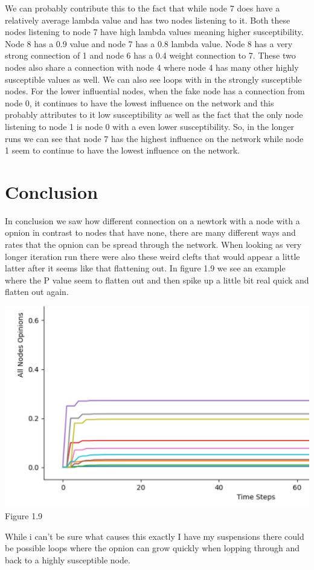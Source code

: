\documentclass[letterpaper]{article}
\begin{document}
We can probably contribute this to the fact that while node 7 does have a relatively average lambda value and has two nodes listening to it. Both these nodes listening to node 7 have  high lambda values meaning higher susceptibility.  Node 8 has a 0.9 value and node 7 has a 0.8 lambda value. Node 8 has a very strong connection of 1 and node 6 has a 0.4 weight connection to 7.  These two nodes also share a connection with node 4 where node 4 has many other highly susceptible values as well.  We can also see loops with in the strongly susceptible nodes.  For the lower influential nodes, when the fake node has a connection from node 0, it continues to have the lowest influence on the network and this probably attributes to it low susceptibility as well as the fact that the only node listening to node 1 is node 0 with a even lower susceptibility.  So, in the longer runs we can see that node 7 has the highest influence on the network while node 1 seem to continue to have the lowest influence on the network.

\section{Conclusion}

In conclusion we saw how different connection on a newtork with a node with a opnion in contrast to nodes that have none, there are many different ways and rates that the opnion can be spread through the network. When looking as very longer iteration run there were also these weird clefts that would appear a little latter after it seems like that flattening out.  In figure 1.9 we see an example where the P value seem to flatten out and then spike up a little bit real quick and flatten out again.  
\begin{center}
	\includegraphics[scale=1.3]{./Images/Figure1.9} \\
	Figure 1.9
\end{center}
While i can't be sure what causes this exactly I have my suspensions there could be possible loops where the opnion can grow quickly when lopping through and back to a highly susceptible node. 
\end{document}
